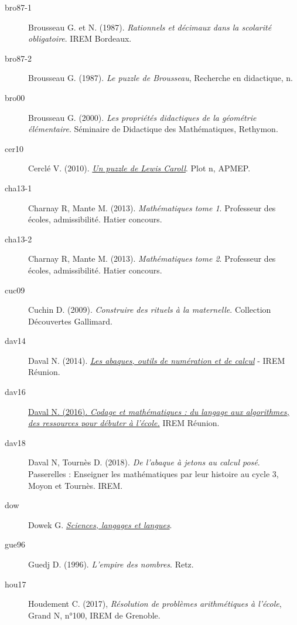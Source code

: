 {\begin{description}
   \item[bro87-1] Brousseau G. et N. (1987). {\it Rationnels et décimaux dans la scolarité obligatoire}. IREM Bordeaux.
   \item[bro87-2] Brousseau G. (1987). {\it Le puzzle de Brousseau}, Recherche en didactique, n.
   \item[bro00] Brousseau G. (2000). {\it Les propriétés didactiques de la géométrie élémentaire}. Séminaire de Didactique des Mathématiques, Rethymon.

   \item[cer10] Cerclé V. (2010). \href{http://www.apmep.fr/IMG/pdf/Puzzle_Carroll_.pdf}{\it Un puzzle de Lewis Caroll}. Plot n, APMEP.
      
   \item[cha13-1] Charnay R, Mante M. (2013). {\it Mathématiques tome 1}. Professeur des écoles, admissibilité. Hatier concours.
   \item[cha13-2] Charnay R, Mante M. (2013). {\it Mathématiques tome 2}. Professeur des écoles, admissibilité. Hatier concours.
   
   \item[cuc09] Cuchin D. (2009). {\it Construire des rituels à la maternelle}. Collection Découvertes Gallimard.
      
   \item[dav14] Daval N. (2014). \href{http://irem.univ-reunion.fr/spip.php?article753}{\it Les abaques, outils de numération et de calcul} - IREM Réunion.
   \item[dav16] \href{http://irem.univ-reunion.fr/spip.php?article886}{Daval N. (2016). {\it Codage et mathématiques : du langage aux algorithmes, des ressources pour débuter à l’école.}} IREM Réunion.
   \item[dav18] Daval N, Tournès D. (2018). {\it De l'abaque à jetons au calcul posé}. Passerelles : Enseigner les mathématiques par leur histoire au cycle 3, Moyon et Tournès. IREM.    
      
   \item[dow] Dowek G. \href{http://www.lsv.fr/~dowek/Philo/grenoble.pdf}{\it Sciences, langages et langues}.
   
   \item[gue96] Guedj D. (1996). {\it L'empire des nombres}. Retz.
   
   \item[hou17] Houdement C. (2017), {\it Résolution de problèmes arithmétiques à l’école}, Grand N, n°100, IREM de Grenoble.
  

\end{description}}
